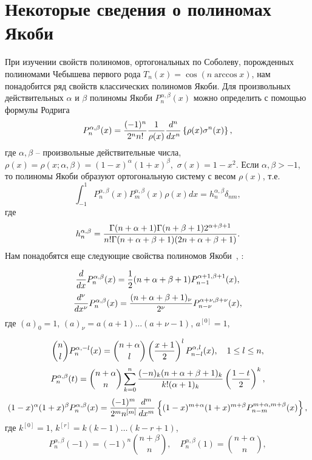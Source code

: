 \section{Некоторые сведения о полиномах Якоби}
При изучении свойств полиномов, ортогональных по Соболеву, порожденных полиномами Чебышева первого рода $T_n(x)=\cos(n\arccos x)$, нам понадобится ряд свойств классических полиномов Якоби.  Для произвольных действительных $\alpha$ и $\beta$ полиномы Якоби  $P_n^{\alpha,\beta}(x)$ можно определить \cite{Sege}  с помощью формулы Родрига
 \begin{equation}\label{3.1}
P_n^{\alpha,\beta}(x) = {(-1)^n\over2^nn!}{1\over\rho(x)}{d^n\over
dx^n} \left\{\rho(x)\sigma^n(x)\right\},
\end{equation}
где $\alpha,\beta$ -- произвольные действительные числа, $\rho(x)=
\rho(x;\alpha,\beta) =
(1-x)^\alpha(1+x)^\beta,\,\,\sigma(x)=1-x^2$. Если
$\alpha,\beta>-1$, то полиномы Якоби образуют ортогональную
систему с весом $\rho(x)$, т.е.
\begin{equation}\label{3.2}
\int_{-1}^1P_n^{\alpha,\beta}(x)P_m^{\alpha,\beta}(x)\rho(x)dx =
h_n^{\alpha,\beta}\delta_{nm},
\end{equation}
где
\begin{equation}\label{3.3}
h_n^{\alpha,\beta} =
{\Gamma(n+\alpha+1)\Gamma(n+\beta+1)2^{\alpha+\beta+1} \over
n!\Gamma(n+\alpha+\beta+1)(2n+\alpha+\beta+1)}.
\end{equation}
Нам понадобятся еще следующие свойства полиномов Якоби~\cite{Sege}, \cite{Gasper}:


\begin{equation}\label{3.4}
{d\over dx}P_n^{\alpha,\beta}(x) =
{1\over2}(n+\alpha+\beta+1)P_{n-1}^{\alpha+1,\beta+1}(x),
\end{equation}
\begin{equation}\label{3.5}
{d^\nu\over dx^\nu}P_n^{\alpha,\beta}(x) =
{(n+\alpha+\beta+1)_\nu\over2^\nu} P_{n-\nu}^{\alpha+\nu,\beta+\nu}(x),
\end{equation}
где $(a)_0=1$, $(a)_\nu=a(a+1)\dots(a+\nu-1)$, $a^{[0]}=1$,

 \begin{equation}\label{3.6}
 {n\choose l}P_n^{\alpha,-l}(x)= {n+\alpha\choose
l}\left({x+1\over2}\right)^lP_{n-l}^{\alpha,l}(x),
     \quad 1\le l \le n,
\end{equation}
\begin{equation}\label{3.7}
P_n^{\alpha,\beta}(t) ={n+\alpha\choose n}
\sum_{k=0}^n{(-n)_k(n+\alpha+\beta+1)_k\over k!(\alpha+1)_k}
\left({1-t\over 2}\right)^k,
\end{equation}
\begin{equation}\label{3.8}
(1-x)^\alpha(1+x)^\beta P_n^{\alpha,\beta}(x)
={(-1)^m\over2^mn^{[m]}}{d^m\over dx^m}
\left\{(1-x)^{m+\alpha}(1+x)^{m+\beta} P_{n-m}^{m+\alpha,m+\beta}(x)
\right\},
\end{equation}
где $k^{[0]}=1$, $k^{[r]}=k(k-1)\dots(k-r+1)$,
\begin{equation}\label{3.9}
P_n^{\alpha,\beta}(-1)=(-1)^n {n+\beta\choose n},\quad P_n^{\alpha,\beta}(1)= {n+\alpha\choose n},
\end{equation}

